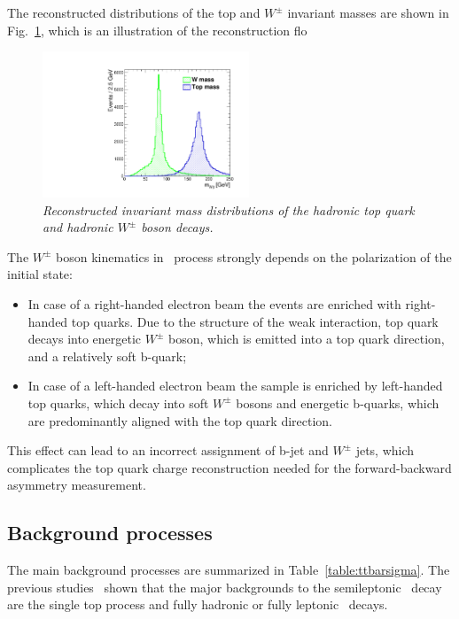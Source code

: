 The reconstructed distributions of the top and $W^\pm$ invariant masses are shown in Fig.~\ref{fig:TopWmass_3}, which is an illustration of the reconstruction flo

\begin{figure}[h]
	{\centering
		\includegraphics[width=0.55\textwidth]{ILD/plots/top-w-mass.pdf}
		\caption{\sl Reconstructed invariant mass distributions of the hadronic top quark and hadronic $W^\pm$ boson decays.
		}
		\label{fig:TopWmass_3}
	}
	
\end{figure}

The $W^\pm$ boson kinematics in \ttbar\ process strongly depends on the polarization of the initial state:
\begin{itemize}
	\item In case of a right-handed electron beam the events are enriched with right-handed top quarks. Due to the structure of the weak interaction, top quark decays into energetic $W^\pm$ boson, which is emitted into a top quark direction, and a relatively soft b-quark;
	\item In case of a left-handed electron beam the sample is enriched by left-handed top quarks, which decay into soft $W^\pm$ bosons and energetic b-quarks, which are predominantly aligned with the top quark direction. 
\end{itemize}
This effect can lead to an incorrect assignment of b-jet and $W^\pm$ jets, which complicates the top quark charge reconstruction needed for the forward-backward asymmetry measurement. 

\subsection{Background processes}
The main background processes are summarized in Table~\ref{table:ttbarsigma}. 
The previous studies~\cite{bib:ILCTOP}\cite{bib:Doublet} shown that the major backgrounds to the semileptonic \ttbar\ decay are the single top process and fully hadronic or fully leptonic \ttbar\ decays. 


